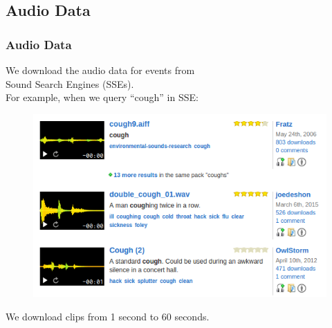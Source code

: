 \documentclass[xcolor=table,slidestop,compress,mathserif]{beamer}
\begin{document}
\subsection{Audio Data}
\begin{frame}
  \frametitle{Audio Data}	
	We download the audio data for events from \\ Sound Search Engines (SSEs). \\ 
	For example, when we query ``cough'' in SSE: \\ 
	\begin{figure}
	\includegraphics[scale=0.35]{figure/cough.png}
	\end{figure}
	We download clips from 1 second to 60 seconds. 
\end{frame}
\end{document}
